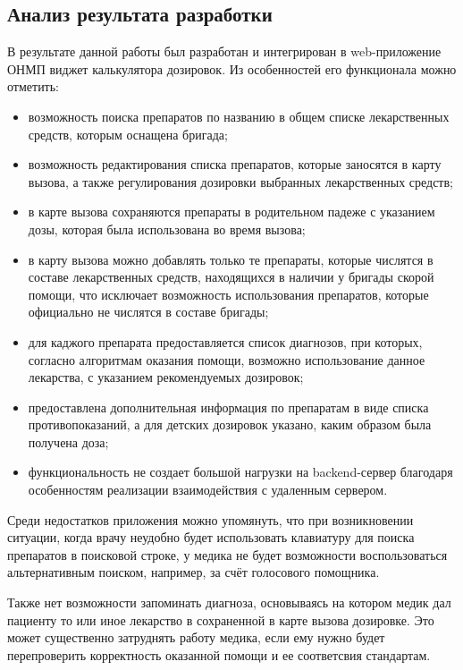 \subsection{Анализ результата разработки}
В результате данной работы был разработан и интегрирован в web-приложение ОНМП виджет калькулятора дозировок. Из особенностей его функционала можно отметить:
\begin{itemize} 

    \item возможность поиска препаратов по названию в общем списке лекарственных средств, которым оснащена бригада;

    \item  возможность редактирования списка препаратов, которые заносятся в карту вызова, а также регулирования дозировки выбранных лекарственных средств;

    \item в карте вызова сохраняются препараты в родительном падеже с указанием дозы, которая была использована во время вызова;

    \item в карту вызова можно добавлять только те препараты, которые числятся в составе лекарственных средств, находящихся в наличии у бригады скорой помощи, что исключает возможность использования препаратов, которые официально не числятся в составе бригады;

    \item для каджого препарата предоставляется список диагнозов, при которых, согласно алгоритмам оказания помощи, возможно использование данное лекарства, с указанием рекомендуемых дозировок;

    \item предоставлена дополнительная информация по препаратам в виде списка противопоказаний, а для детских дозировок указано, каким образом была получена доза;

    \item  функциональность не создает большой нагрузки на backend-сервер благодаря особенностям реализации взаимодействия с удаленным сервером.
\end{itemize}
    
Среди недостатков приложения можно упомянуть, что при возникновении ситуации, когда врачу неудобно будет использовать клавиатуру для поиска препаратов в поисковой строке, у медика не будет возможности воспользоваться альтернативным поиском, например, за счёт голосового помощника.

Также нет возможности запоминать диагноза, основываясь на котором медик дал пациенту то или иное лекарство в сохраненной в карте вызова дозировке. Это может существенно затруднять работу медика, если ему нужно будет перепроверить корректность оказанной помощи и ее соответсвия стандартам.

